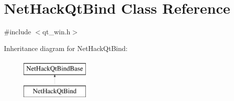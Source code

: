 \hypertarget{classNetHackQtBind}{\section{Net\+Hack\+Qt\+Bind Class Reference}
\label{classNetHackQtBind}
}


{\ttfamily \#include $<$qt\+\_\+win.\+h$>$}

Inheritance diagram for Net\+Hack\+Qt\+Bind\+:\begin{figure}[H]
\begin{center}
\leavevmode
\includegraphics[height=2.000000cm]{classNetHackQtBind}
\end{center}
\end{figure}
